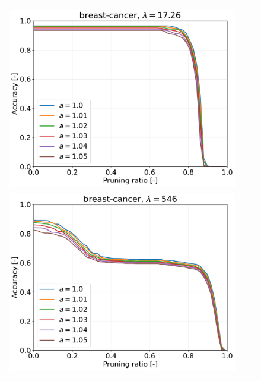 \begin{figure}[H]
\begin{tabular}{ccc}
		\begin{minipage}[b]{0.3\hsize}\centering {\small Dataset: breast-cancer, $\lambda=n \cdot 10^{-1.5}$}\\\includegraphics[width=0.8\hsize]{fig/breast/kernel_ss_screening_rate_lam17.26_x_n_y_etest.pdf}\end{minipage}
		&
		\begin{minipage}[b]{0.3\hsize}\centering {\small Dataset: breast-cancer, $\lambda=n$}\\\includegraphics[width=0.8\hsize]{fig/breast/kernel_ss_screening_rate_lam546_x_n_y_etest.pdf}\end{minipage}
		\\

\end{tabular}
\end{figure}
